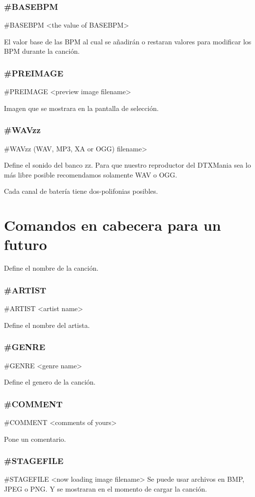 \documentclass[a4paper,11pt,oneside]{book}
\begin{document}
\subsubsection{\#BASEBPM}
\#BASEBPM <the value of BASEBPM>

El valor base de las BPM al cual se añadirán o restaran valores para modificar los BPM durante la canción.


\subsubsection{\#PREIMAGE}
\#PREIMAGE <preview image filename>

Imagen que se mostrara en la pantalla de selección.

\subsubsection{\#WAVzz}
\#WAVzz (WAV, MP3, XA or OGG) filename>


Define el sonido del banco zz. Para que nuestro reproductor del DTXMania sea lo más libre posible recomendamos solamente WAV o OGG.

Cada canal de batería tiene dos-polifonias posibles.


\section{Comandos en cabecera para un futuro}

Define el nombre de la canción.
\subsubsection{\#ARTIST}
\#ARTIST <artist name>

Define el nombre del artista.

\subsubsection{\#GENRE}
\#GENRE <genre name>

Define el genero de la canción.

\subsubsection{\#COMMENT}
\#COMMENT <comments of yours>

Pone un comentario.

\subsubsection{\#STAGEFILE}
\#STAGEFILE <now loading image filename>
Se puede usar archivos en BMP, JPEG o PNG. Y se mostraran en el momento de cargar la canción.
\end{document}
